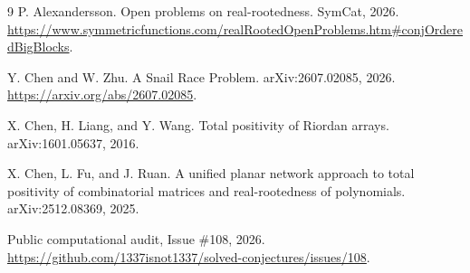 \documentclass[11pt]{article}
\theoremstyle{definition}
\begin{document}
\begin{thebibliography}{9}
P. Alexandersson.
\newblock Open problems on real-rootedness.
\newblock SymCat, 2026.
\newblock \url{https://www.symmetricfunctions.com/realRootedOpenProblems.htm#conjOrderedBigBlocks}.

Y. Chen and W. Zhu.
\newblock A Snail Race Problem.
\newblock arXiv:2607.02085, 2026.
\newblock \url{https://arxiv.org/abs/2607.02085}.

X. Chen, H. Liang, and Y. Wang.
\newblock Total positivity of Riordan arrays.
\newblock arXiv:1601.05637, 2016.

X. Chen, L. Fu, and J. Ruan.
\newblock A unified planar network approach to total positivity of combinatorial matrices and real-rootedness of polynomials.
\newblock arXiv:2512.08369, 2025.

\newblock Public computational audit, Issue \#108, 2026.
\newblock \url{https://github.com/1337isnot1337/solved-conjectures/issues/108}.
\end{thebibliography}
\end{document}
